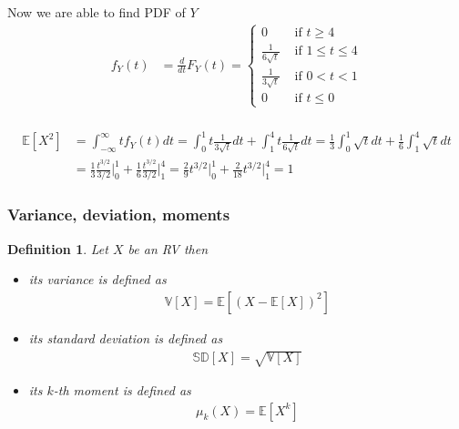 \documentclass[10pt]{article}
\newtheorem*{definition}{Definition}
\begin{document}
Now we are able to find PDF of $Y$
\begin{align}
    f_Y(t)
     & =\frac{d}{dt} F_Y(t)
    =\begin{cases}
        0                   & \mbox { if } t\geq 4       \\
        \frac{1}{6\sqrt{t}} & \mbox { if } 1\leq t\leq 4 \\
        \frac{1}{3\sqrt{t}} & \mbox { if } 0<t<1         \\
        0                   & \mbox { if } t\leq 0
    \end{cases} \\
\end{align}

\begin{align}
    \mathbb{E}[X^2]
     & =\int_{-\infty}^{\infty} t f_Y(t)dt
    =\int_0^1 t\frac{1}{3\sqrt{t}}dt+\int_1^4 t\frac{1}{6\sqrt{t}}dt
    =\frac{1}{3}\int_0^1 \sqrt{t}dt+\frac{1}{6}\int_1^4 \sqrt{t}dt \\
     & =\frac{1}{3}\frac{t^{3/2}}{3/2}\Biggl|_0^1 +
    \frac{1}{6}\frac{t^{3/2}}{3/2}\Biggl|_1^4
    =\frac{2}{9}t^{3/2}\Biggl|_0^1 +\frac{2}{18}t^{3/2}\Biggl|_1^4
    =1
\end{align}

\subsubsection{Variance, deviation, moments}

\begin{definition}
    Let $X$ be an RV then
    \begin{itemize}
        \item its variance is defined as
              \begin{align}
                  \mathbb{V}[X]=\mathbb{E}[{(X-\mathbb{E}[X])}^2]
              \end{align}
        \item its standard deviation is defined as
              \begin{align}
                  \mathbb{SD}[X]=\sqrt{\mathbb{V}[X]}
              \end{align}
        \item its $k$-th moment is defined as
              \begin{align}
                  \mu_k(X)=\mathbb{E}[X^k]
              \end{align}
    \end{itemize}
\end{definition}
\end{document}
